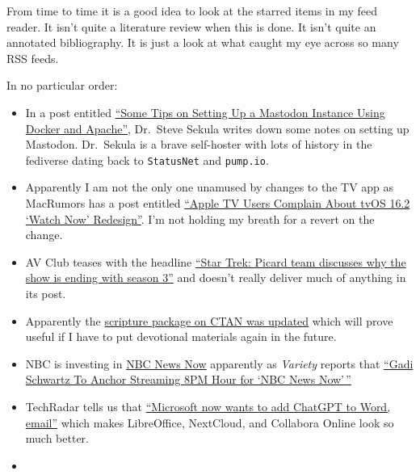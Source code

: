 From time to time it is a good idea to look at the starred items in my
feed reader. It isn't quite a literature review when this is done. It
isn't quite an annotated bibliography. It is just a look at what caught
my eye across so many RSS feeds.

In no particular order:

\begin{itemize}
\tightlist
\item
  In a post entitled
  \href{https://steve.cooleysekula.net/blog/2023/01/09/some-tips-on-setting-up-a-mastodon-instance-using-docker-and-apache/}{``Some
  Tips on Setting Up a Mastodon Instance Using Docker and Apache''},
  Dr.~Steve Sekula writes down some notes on setting up Mastodon.
  Dr.~Sekula is a brave self-hoster with lots of history in the
  fediverse dating back to \texttt{StatusNet} and \texttt{pump.io}.\\
\item
  Apparently I am not the only one unamused by changes to the TV app as
  MacRumors has a post entitled
  \href{https://www.macrumors.com/2023/01/09/tvos-16-2-watch-now-design-complaints/}{``Apple
  TV Users Complain About tvOS 16.2 `Watch Now' Redesign''}. I'm not
  holding my breath for a revert on the change.\\
\item
  AV Club teases with the headline
  \href{https://www.avclub.com/star-trek-picard-team-why-show-ending-with-season-3-1849966879}{``Star
  Trek: Picard team discusses why the show is ending with season 3''}
  and doesn't really deliver much of anything in its post.
\item
  Apparently the
  \href{https://www.ctan.org/ctan-ann/id/mailman.3032.1673290313.3715.ctan-ann@ctan.org}{scripture
  package on CTAN was updated} which will prove useful if I have to put
  devotional materials again in the future.\\
\item
  NBC is investing in \href{https://www.nbcnews.com/now}{NBC News Now}
  apparently as \emph{Variety} reports that
  \href{https://variety.com/2023/tv/news/gadi-schwartz-nbc-news-streaming-anchor-1235482553/}{``Gadi
  Schwartz To Anchor Streaming 8PM Hour for `NBC News Now'\,''}
\item
  TechRadar tells us that
  \href{https://www.techradar.com/news/microsoft-now-wants-to-add-chatgpt-to-word-email}{``Microsoft
  now wants to add ChatGPT to Word, email''} which makes LibreOffice,
  NextCloud, and Collabora Online look so much better.
\item

\end{itemize}
